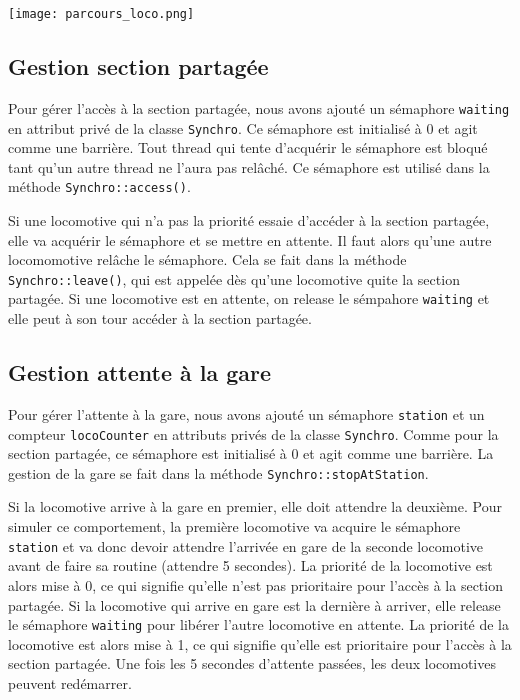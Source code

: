 \documentclass{article}
\begin{document}
\begin{center}
\texttt{[image: parcours\_loco.png]}
\end{center}

\subsection*{Gestion section partagée}
Pour gérer l'accès à la section partagée, nous avons ajouté un sémaphore \texttt{waiting} en attribut privé de la classe \texttt{Synchro}.
Ce sémaphore est initialisé à 0 et agit comme une barrière. Tout thread qui tente d'acquérir le sémaphore est bloqué tant qu'un
autre thread ne l'aura pas relâché. Ce sémaphore est utilisé dans la méthode \texttt{Synchro::access()}. 

Si une locomotive qui
n'a pas la priorité essaie d'accéder à la section partagée, elle va acquérir le sémaphore et se mettre en attente. Il faut alors
qu'une autre locomomotive relâche le sémaphore. Cela se fait dans la méthode \texttt{Synchro::leave()}, qui est appelée dès qu'une
locomotive quite la section partagée. Si une locomotive est en attente, on release le sémpahore \texttt{waiting} et elle peut
à son tour accéder à la section partagée.

\subsection*{Gestion attente à la gare}
Pour gérer l'attente à la gare,  nous avons ajouté un sémaphore \texttt{station} et un compteur \texttt{locoCounter} en attributs
privés de la classe \texttt{Synchro}. Comme pour la section partagée, ce sémaphore est initialisé à 0 et agit comme une barrière.
La gestion de la gare se fait dans la méthode \texttt{Synchro::stopAtStation}.


Si la locomotive arrive à la gare en premier, elle doit attendre la deuxième. Pour simuler ce comportement, la première locomotive
va acquire le sémaphore \texttt{station} et va donc devoir attendre l'arrivée en gare de la seconde locomotive avant de faire sa
routine (attendre 5 secondes). La priorité de la locomotive est alors mise à 0, ce qui signifie qu'elle n'est pas prioritaire pour 
l'accès à la section partagée. Si la locomotive qui arrive en gare est la dernière à arriver, elle release le sémaphore \texttt{waiting} 
pour libérer l'autre locomotive en attente. La priorité de la locomotive est 
alors mise à 1, ce qui signifie qu'elle est prioritaire pour l'accès à la section partagée. 
Une fois les 5 secondes d'attente passées, les deux locomotives peuvent redémarrer.
\end{document}
